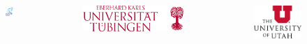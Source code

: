 \documentclass{beamer}
\begin{document}
\begin{frame}[fragile]
\begin{columns}[T]
\begin{column}{.135\textwidth}
\begin{figure}
\begin{center}
\includegraphics[width=0.5\linewidth]{img/BI-2013.png}
\end{center}
\end{figure}
\end{column}


\begin{column}{.135\textwidth}
\begin{figure}
\begin{center}
\vspace{1.75cm}
\hspace{-1.5cm}
\includegraphics[width=1\linewidth]{img/UT_WBMW_Rot_P201.pdf} 
\end{center}
\end{figure}
\end{column}

\begin{column}{.135\textwidth}
\begin{figure}
\begin{center}
\vspace{0.5cm}
\includegraphics[width=0.7\linewidth]{img/Ulogo_pms187.eps} 
\end{center}
\end{figure}
\end{column}


\end{columns}
\end{frame}
\end{document}
